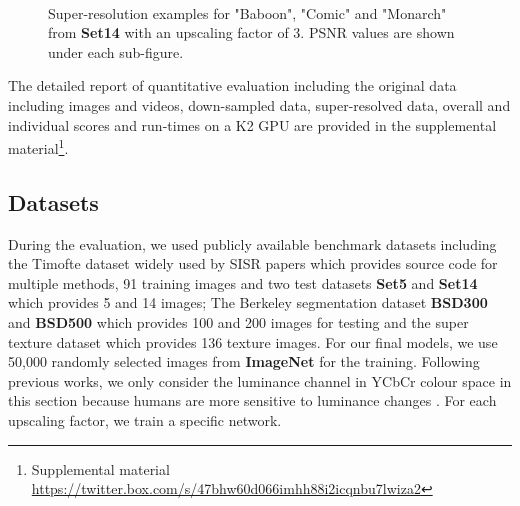 \documentclass[10pt,twocolumn,letterpaper]{article}
\begin{document}
\begin{figure}[htbp]
\begin{center}
~
~
\\
\caption{Super-resolution examples for "Baboon", "Comic" and "Monarch" from \textbf{Set14} with an upscaling factor of 3. PSNR values are shown under each sub-figure. \label{fig:visualcomparison1}}
\end{center}
\end{figure}

The detailed report of quantitative evaluation including the original data including images and videos, down-sampled data,  super-resolved data, overall and individual scores and run-times on a K2 GPU are provided in the supplemental material\footnote{Supplemental material \url{https://twitter.box.com/s/47bhw60d066imhh88i2icqnbu7lwiza2}}.

\subsection{Datasets}

During the evaluation, we used publicly available benchmark datasets including the Timofte dataset \cite{timofte2014a+} widely used by \ac{SISR} papers \cite{dong2015image,wang2015deeply,chen2015trainable} which provides source code for multiple methods, 91 training images and two test datasets \textbf{Set5} and \textbf{Set14} which provides 5 and 14 images; The Berkeley segmentation dataset \cite{MartinFTM01} \textbf{BSD300} and \textbf{BSD500} which provides 100 and 200 images for testing and the super texture dataset \cite{dai2015jointly} which provides 136 texture images. For our final models, we use 50,000 randomly selected images from \textbf{ImageNet} \cite{russakovsky2014imagenet} for the training. Following previous works, we only consider the luminance channel in YCbCr colour space in this section because humans are more sensitive to luminance changes \cite{schulter2015fast}. For each upscaling factor, we train a specific network.
\end{document}

